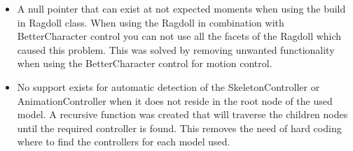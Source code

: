 \documentclass[letterpaper]{article}
\begin{document}
			\begin{itemize}
				\item A null pointer that can exist at not expected moments when using the build in Ragdoll class. When using the Ragdoll in combination with BetterCharacter control you can not use all the facets of the Ragdoll which caused this problem. This was solved by removing unwanted functionality when using the BetterCharacter control for motion control.
				\item No support exists for automatic detection of the SkeletonController or AnimationController when it does not reside in the root node of the used model. A recursive function was created that will traverse the children nodes until the required controller is found. This removes the need of hard coding where to find the controllers for each model used.
			\end{itemize}
\end{document}
